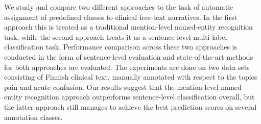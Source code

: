 We study and compare two different approaches to the task of automatic assignment of predefined classes to clinical free-text narratives. In the first approach this is treated as a traditional mention-level named-entity recognition task, while the second approach treats it as a sentence-level multi-label classification task. Performance comparison across these two approaches is conducted in the form of sentence-level evaluation and state-of-the-art methods for both approaches are evaluated. The experiments are done on two data sets consisting of Finnish clinical text, manually annotated with respect to the topics pain and acute confusion. Our results suggest that the mention-level named-entity recognition approach outperforms sentence-level classification overall, but the latter approach still manages to achieve the best prediction scores on several annotation classes.
